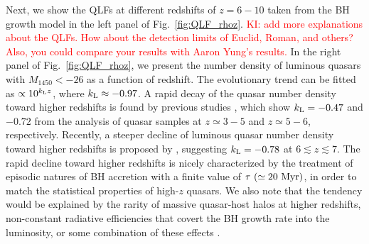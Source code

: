 \documentclass[twocolumn, twocolappendix]{aastex63}
\newcommand{\Muv}{M_{1450}}
\newcommand{\red}[1]{\textcolor{red}{ #1}}
\begin{document}
\begin{CJK*}{UTF8}{gbsn}
Next, we show the QLFs at different redshifts of $z=6-10$ taken from the BH growth model in the left panel of Fig.~\ref{fig:QLF_rhoz}.
\red{KI: add more explanations about the QLFs. How about the detection limits of Euclid, Roman, and others?
Also, you could compare your results with Aaron Yung's results.}
In the right panel of Fig.~\ref{fig:QLF_rhoz}, we present the number density of luminous quasars with $\Muv <-26$ as a function of redshift.
The evolutionary trend can be fitted as $\propto 10^{k_{\rm L}z}$, where $k_{\rm L}\approx -0.97$.
A rapid decay of the quasar number density toward higher redshifts is found by previous studies \citep[e.g.,][]{2001AJ....122.2833F,2016ApJ...833..222J},
which show $k_{\rm L}= -0.47$ and $-0.72$ from the analysis of quasar samples at $z\simeq 3-5$ and $z\simeq 5-6$, respectively.
Recently, a steeper decline of luminous quasar number density toward higher redshifts is proposed by \citet{2019ApJ...884...30W},
suggesting $k_{\rm L}=-0.78$ at $6\lesssim z \lesssim 7$.
The rapid decline toward higher redshifts is nicely characterized by the treatment of episodic natures of BH accretion with a finite value of
$\tau ~(\simeq 20~{\rm Myr})$, in order to match the statistical properties of high-$z$ quasars.
We also note that the tendency would be explained by the rarity of massive quasar-host halos at higher redshifts,
non-constant radiative efficiencies that covert the BH growth rate into the luminosity, or some combination of these effects
\citep[e.g.,][]{2010ApJ...718..231S}.



\end{CJK*}
\end{document}
